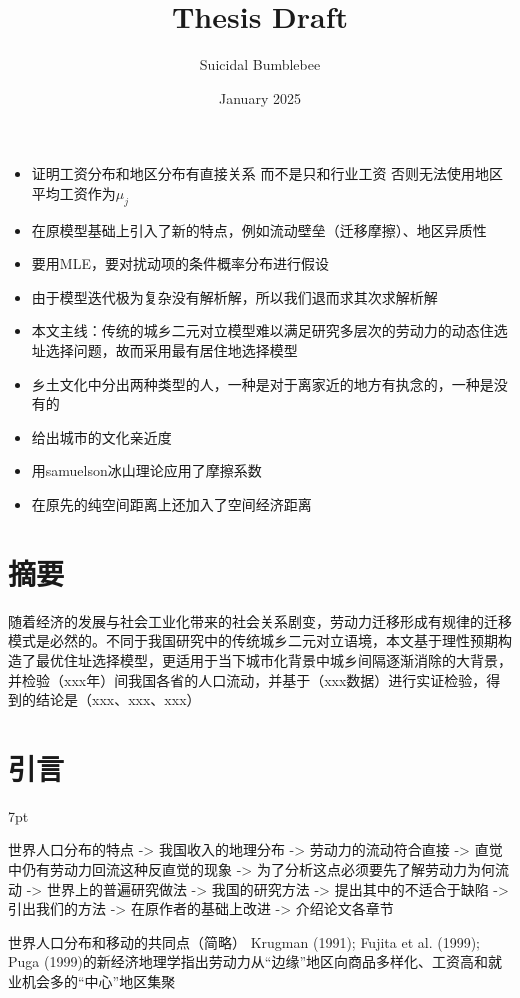 \documentclass{article}
\title{Thesis Draft}
\author{Suicidal Bumblebee }
\date{January 2025}
\newenvironment{greenblock}{%
\def\FrameCommand{%
  \hspace{1pt}%
    {\color{Green}%
    \vrule width 2pt}%
    {\color{greenshade}%
    \vrule width 4pt}%
  \colorbox{greenshade}%
}%
\MakeFramed{%
  \advance%
  \hsize-%
  \width%
  \FrameRestore}%
\noindent\hspace{-4.55pt}%
\begin{adjustwidth}{}{7pt}%
\vspace{2pt}\vspace{2pt}%
}
{%
\vspace{2pt}\end{adjustwidth}\endMakeFramed%
}
\numberwithin{equation}{section} %
\begin{document}
\maketitle

\begin{itemize}
\item 证明工资分布和地区分布有直接关系 而不是只和行业工资 否则无法使用地区平均工资作为$\mu_{j}$
\item 在原模型基础上引入了新的特点，例如流动壁垒（迁移摩擦）、地区异质性
\item 要用MLE，要对扰动项的条件概率分布进行假设
\item 由于模型迭代极为复杂没有解析解，所以我们退而求其次求解析解
\item 本文主线：传统的城乡二元对立模型难以满足研究多层次的劳动力的动态住选址选择问题，故而采用最有居住地选择模型
\item 乡土文化中分出两种类型的人，一种是对于离家近的地方有执念的，一种是没有的
\item 给出城市的文化亲近度
\item 用samuelson冰山理论应用了摩擦系数
\item 在原先的纯空间距离上还加入了空间经济距离
\end{itemize}

\section{摘要}
随着经济的发展与社会工业化带来的社会关系剧变，劳动力迁移形成有规律的迁移模式是必然的。不同于我国研究中的传统城乡二元对立语境，本文基于理性预期构造了最优住址选择模型，更适用于当下城市化背景中城乡间隔逐渐消除的大背景，并检验（xxx年）间我国各省的人口流动，并基于（xxx数据）进行实证检验，得到的结论是（xxx、xxx、xxx）



\section{引言}

\begin{greenblock}
世界人口分布的特点 -> 我国收入的地理分布 -> 劳动力的流动符合直接 -> 直觉中仍有劳动力回流这种反直觉的现象 -> 为了分析这点必须要先了解劳动力为何流动 -> 世界上的普遍研究做法 -> 我国的研究方法 -> 提出其中的不适合于缺陷 -> 引出我们的方法 -> 在原作者的基础上改进 -> 介绍论文各章节
\end{greenblock}


世界人口分布和移动的共同点（简略）
Krugman (1991); Fujita et al. (1999); Puga (1999)的新经济地理学指出劳动力从“边缘”地区向商品多样化、工资高和就业机会多的“中心”地区集聚
\end{document}
